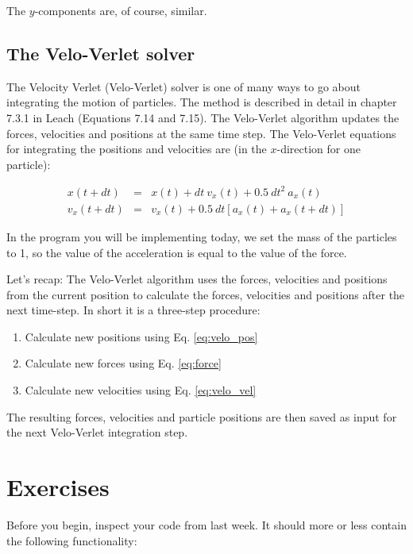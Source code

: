 \documentclass{article}
\begin{document}
The $y$-components are, of course, similar. 

\subsection{The Velo-Verlet solver}

The Velocity Verlet (Velo-Verlet) solver is one of many ways to go about
integrating the motion of particles. The method is described in detail in
chapter 7.3.1 in Leach (Equations 7.14 and 7.15). The Velo-Verlet algorithm
updates the forces, velocities and positions at the same time step. The
Velo-Verlet equations for integrating the positions and velocities are (in the
$x$-direction for one particle):

\begin{eqnarray}
x(t + dt) &=& x(t) + dt\ v_x(t) + 0.5\ dt^2\ a_x(t)\\
v_x(t + dt) &=& v_x(t) + 0.5\ dt \left[a_x(t) + a_x(t+dt)\right]
\end{eqnarray}

In the program you will be implementing today, we set the mass of the particles
to 1, so the value of the acceleration is equal to the value of the
force.

Let's recap: The Velo-Verlet algorithm uses the forces,
velocities and positions from the current position to calculate the forces,
velocities and positions after the next time-step. In short it is a three-step
procedure:

\begin{enumerate}
    \item Calculate new positions using Eq. \ref{eq:velo_pos}
    \item Calculate new forces using Eq. \ref{eq:force}
    \item Calculate new velocities using Eq. \ref{eq:velo_vel}
\end{enumerate}

The resulting forces, velocities and particle positions are then saved as input
for the next Velo-Verlet integration step.


\newpage
\clearpage
\section{Exercises}

Before you begin, inspect your code from last week. It should more or less
contain the following functionality:

\end{document}
